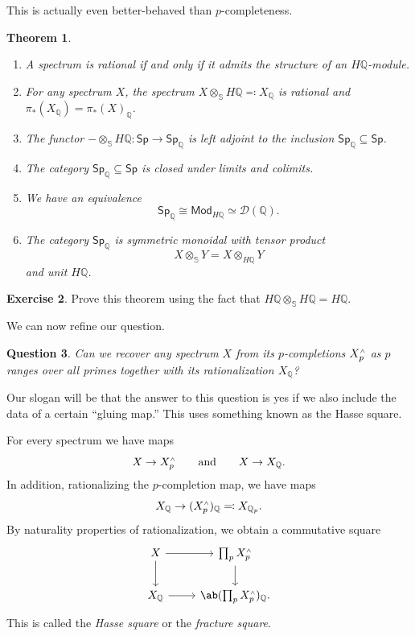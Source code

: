 \documentclass[10pt, oneside]{memoir}
\newtheorem{thm}{Theorem}[subsection]
\newtheorem{quest}[thm]{Question}
\theoremstyle{definition}
\newtheorem{exer}[thm]{Exercise}
\theoremstyle{remark}
\theoremstyle{plain}
\theoremstyle{definition}
\theoremstyle{remark}
\newcommand{\Q}{\mathbb{Q}}
\newcommand{\bS}{\mathbb{S}}
\newcommand{\mc}[1]{\mathcal{#1}}
\newcommand{\ms}[1]{\mathsf{#1}}
\newcommand{\1}{\mathbf{1}}
\newcommand{\2}{\mathbf{2}}
\newcommand{\3}{\mathbf{3}}
\newcommand{\sw}{\mathsmaller{\wedge}}
\begin{document}
This is actually even better-behaved than \(p \)-completeness.
\begin{thm}\leavevmode
    \begin{enumerate}
        \item A spectrum is rational if and only if it admits the structure of an \(H\Q \)-module.
        \item For any spectrum \(X \), the spectrum \(X \otimes_{\bS} H\Q \eqqcolon X_{\Q} \) is rational and \(\pi_*(X_{\Q}) = \pi_*(X)_{\Q} \). 
        \item The functor \(-\otimes_{\bS} H\Q \colon \ms{Sp} \to \ms{Sp}_{\Q} \) is left adjoint to the inclusion \(\ms{Sp}_{\Q} \subseteq \ms{Sp} \).
        \item The category \(\ms{Sp}_{\Q} \subseteq \ms{Sp} \) is closed under limits and colimits.
        \item We have an equivalence
        \[ \ms{Sp}_{\Q} \cong \ms{Mod}_{H\Q} \simeq \mc{D}(\Q). \]
        \item The category \(\ms{Sp}_{\Q} \) is symmetric monoidal with tensor product
        \[ X \otimes_{\bS} Y = X \otimes_{H\Q} Y \]
        and unit \(H\Q \).
    \end{enumerate}
\end{thm}

\begin{exer}
    Prove this theorem using the fact that \(H\Q \otimes_{\bS} H\Q = H\Q \).
\end{exer}

We can now refine our question.
\begin{quest}
    Can we recover any spectrum \(X \) from its \(p \)-completions \(X_p^{\sw} \) as \(p \) ranges over all primes together with its rationalization \(X_{\Q} \)?
\end{quest}

Our slogan will be that the answer to this question is yes if we also include the data of a certain ``gluing map.'' This uses something known as the Hasse square.

For every spectrum we have maps
\[ X \to X_p^{\sw} \qquad \text{and} \qquad X \to X_{\Q}. \]
In addition, rationalizing the \(p \)-completion map, we have maps
\[ X_{\Q} \to (X_p^{\sw})_{\Q} \eqqcolon X_{\Q_p}. \]
By naturality properties of rationalization, we obtain a commutative square
\begin{equation*}
\begin{tikzcd}
    X \ar{r} \ar{d} & \prod_p X_p^{\sw} \ar{d} \\
    X_{\Q} \ar{r} & \ab(\prod_p X_{p}^{\sw})_{\Q}.
\end{tikzcd}
\end{equation*}
This is called the \textit{Hasse square} or the \textit{fracture square}.
\end{document}
